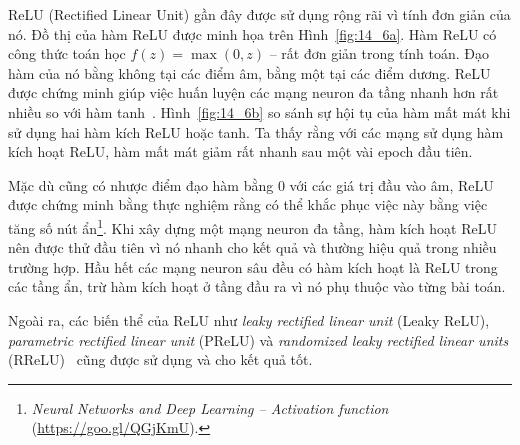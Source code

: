 ReLU (Rectified Linear Unit) gần đây được sử dụng rộng rãi vì tính đơn giản của
nó. Đồ thị của hàm ReLU được minh họa trên Hình~\ref{fig:14_6a}. Hàm ReLU có
công thức toán học $f(z) = \max(0, z)$ -- rất đơn giản trong tính toán.
Đạo hàm của nó bằng không tại các điểm âm, bằng một tại các điểm dương. ReLU được
chứng minh giúp việc huấn luyện các mạng neuron đa tầng nhanh hơn rất nhiều so với hàm
tanh~\cite{krizhevsky2012imagenet}. Hình~\ref{fig:14_6b} so sánh sự hội tụ của
hàm mất mát khi sử dụng hai hàm kích ReLU hoặc tanh. Ta thấy rằng với các mạng sử dụng hàm kích hoạt ReLU, hàm mất mát giảm rất nhanh sau một vài epoch đầu tiên.





Mặc dù cũng có nhược điểm đạo hàm bằng 0 với các giá trị đầu vào âm, ReLU được
chứng minh bằng thực nghiệm rằng có thể khắc phục việc này bằng việc tăng số
nút ẩn\footnote{\textit{Neural Networks and Deep Learning  --  Activation
function} (\url{https://goo.gl/QGjKmU}).}. Khi xây dựng một mạng neuron đa tầng, hàm kích hoạt ReLU nên được thử đầu tiên vì nó nhanh cho kết quả và thường hiệu quả trong nhiều trường hợp. Hầu hết các mạng neuron sâu
đều có hàm kích hoạt là ReLU trong các tầng ẩn, trừ hàm kích hoạt ở tầng đầu ra vì nó phụ thuộc vào từng bài toán.

Ngoài ra, các biến thể của ReLU như \textit{leaky rectified linear unit} (Leaky
ReLU), \textit{parametric rectified linear unit} (PReLU) và \textit{randomized
leaky rectified linear units} (RReLU)~\cite{xu2015empirical} cũng được sử dụng
và cho kết quả tốt.



